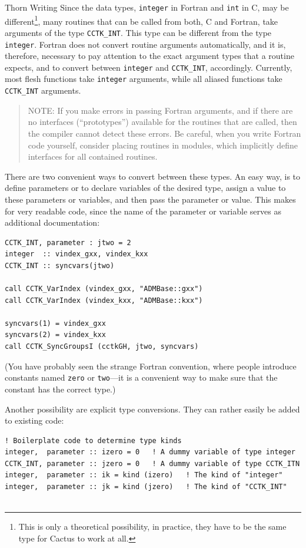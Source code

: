 \begin{cactuspart}{Thorn Writing}
Since the data types, \texttt{integer} in Fortran and \texttt{int} in C,
may be different\footnote{This is only a theoretical possibility, in practice, they
  have to be the same type for Cactus to work at all.}, 
many routines that can be called from both, C and Fortran, take
arguments of the type \texttt{CCTK\_INT}.  This type can be different
from the type \texttt{integer}.  Fortran does not convert routine
arguments automatically, and it is, therefore, necessary to pay
attention to the exact argument types that a routine expects, and to
convert between \texttt{integer} and \texttt{CCTK\_INT}, accordingly.
Currently, most flesh functions take \texttt{integer} arguments, while
all aliased functions take \texttt{CCTK\_INT} arguments.

\begin{quote}
  NOTE: If you make errors in passing Fortran arguments, and if there
  are no interfaces (``prototypes'') available for the routines that
  are called, then the compiler cannot detect these errors.  Be
  careful, when you write Fortran code yourself, consider placing
  routines in modules, which implicitly define interfaces for all
  contained routines.
\end{quote}

There are two convenient ways to convert between these types.  An easy
way, is to define parameters or to declare variables of the desired
type, assign a value to these parameters or variables, and then pass
the parameter or value.  This makes for very readable code, since the
name of the parameter or variable serves as additional documentation:

\begin{verbatim}
CCTK_INT, parameter : jtwo = 2
integer  :: vindex_gxx, vindex_kxx
CCTK_INT :: syncvars(jtwo)

call CCTK_VarIndex (vindex_gxx, "ADMBase::gxx")
call CCTK_VarIndex (vindex_kxx, "ADMBase::kxx")

syncvars(1) = vindex_gxx
syncvars(2) = vindex_kxx
call CCTK_SyncGroupsI (cctkGH, jtwo, syncvars)
\end{verbatim}

(You have probably seen the strange Fortran convention, where people
introduce constants named \texttt{zero} or \texttt{two}---it is a convenient way to make sure that the
constant has the correct type.)

Another possibility are explicit type conversions.  They can rather
easily be added to existing code:

\begin{verbatim}
! Boilerplate code to determine type kinds
integer,  parameter :: izero = 0   ! A dummy variable of type integer
CCTK_INT, parameter :: jzero = 0   ! A dummy variable of type CCTK_ITN
integer,  parameter :: ik = kind (izero)   ! The kind of "integer"
integer,  parameter :: jk = kind (jzero)   ! The kind of "CCTK_INT"


\end{verbatim}
\end{cactuspart}
